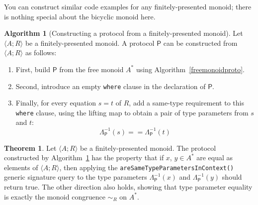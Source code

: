 \documentclass[a4paper,headsepline,bibliography=totoc,toc=flat,fleqn,twoside=semi]{scrbook}
\theoremstyle{definition}
\theoremstyle{definition}
\theoremstyle{definition}
\newtheorem{algorithm}{Algorithm}[chapter]
\newtheorem{theorem}{Theorem}[chapter]
\newcommand{\proto}[1]{\bm{\mathsf{#1}}}
\begin{document}
You can construct similar code examples for any finitely-presented monoid; there is nothing special about the bicyclic monoid here.
\begin{algorithm}[Constructing a protocol from a finitely-presented monoid]\label{protocolmonoidalgo} Let $\langle A;R\rangle$ be a finitely-presented monoid. A protocol $\proto{P}$ can be constructed from $\langle A;R\rangle$ as follows:
\begin{enumerate}
\item First, build $\proto{P}$ from the free monoid $A^*$ using Algorithm~\ref{freemonoidproto}.
\item Second, introduce an empty \texttt{where} clause in the declaration of $\proto{P}$.
\item Finally, for every equation $s=t$ of $R$, add a same-type requirement to this \texttt{where} clause, using the lifting map to obtain a pair of type parameters from $s$ and $t$:
\[\Lambda_{\proto{P}}^{-1}(s)==\Lambda_{\proto{P}}^{-1}(t)\]
\end{enumerate}
\end{algorithm}
\begin{theorem}\label{protocolmonoidthm} Let $\langle A;R\rangle$ be a finitely-presented monoid. The protocol~\proto{P} constructed by Algorithm~\ref{protocolmonoidalgo} has the property that if $x$, $y \in A^*$ are equal as elements of $\langle A;R\rangle$, then applying the \texttt{areSameTypeParametersInContext()} generic signature query to the type parameters $\Lambda_{\proto{P}}^{-1}(x)$ and $\Lambda_{\proto{P}}^{-1}(y)$ should return true. The other direction also holds, showing that type parameter equality is exactly the monoid congruence $\sim_R$ on $A^*$.
\end{theorem}
\end{document}

